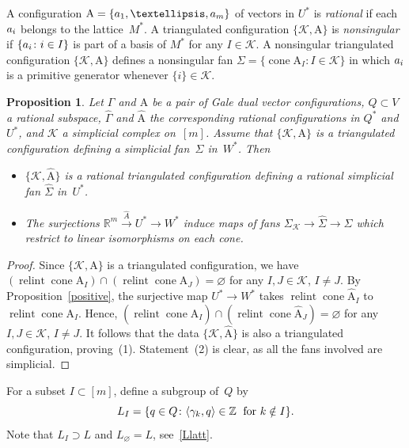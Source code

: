\documentclass[a4paper]{amsart}
\newtheorem{proposition}[theorem]{Proposition}
\theoremstyle{definition}
\theoremstyle{remark}
\numberwithin{equation}{section}
\def\R{\mathbb R}
\def\R{\mathbb R}
\def\Z{\mathbb Z}
\def\sK{\mathcal K}
\newcommand{\mb}[1]{{\textbf {\textit#1}}}
\def\cone{\mathop{\mathrm{cone}}}
\def\relint{\mathop{\mathrm{relint}}}
\newcommand{\<}{\langle}
\renewcommand{\>}{\rangle}
\begin{document}
A configuration $\mathrm A=\{\mb a_1,\ldots,\mb a_m\}$ of vectors in $U^*$ is \emph{rational} if each $\mb a_i$ belongs to the lattice~$M^*$.
A triangulated configuration $\{\mathcal K,\mathrm A\}$ is \emph{nonsingular} if $\{\mb a_i\colon i\in I\}$ is part of a basis of $M^*$ for any $I\in\mathcal K$. A nonsingular triangulated configuration $\{\mathcal K,\mathrm A\}$ defines a nonsingular fan $\Sigma=\{\cone\mathrm A_I\colon I\in\mathcal K\}$ in which $\mb a_i$ is a primitive generator whenever $\{i\}\in\mathcal K$.

\begin{proposition}\label{ahatfan}
Let $\Gamma$ and $\mathrm A$ be a pair of Gale dual vector configurations,  $Q\subset V$ a rational subspace, $\widehat\Gamma$ and $\widehat{\mathrm A}$ the corresponding rational configurations in $Q^*$ and $U^*$, and $\sK$ a simplicial complex on~$[m]$. Assume that $\{\sK,\mathrm A\}$ is a triangulated configuration defining a simplicial fan~$\Sigma$ in~$W^*$. Then 
\begin{itemize}
\item[(1)]
$\{\sK,\widehat{\mathrm A}\}$ is a rational triangulated configuration defining a rational simplicial fan $\widehat\Sigma$ in~$U^*$. 

\item[(2)] The surjections $\R^m\xrightarrow{\widehat A} U^*\to W^*$
induce maps of fans $\Sigma_\sK\to\widehat\Sigma\to\Sigma$ which restrict to linear isomorphisms on each cone.
\end{itemize}
\end{proposition}
\begin{proof}
Since $\{\sK,\mathrm A\}$ is a triangulated configuration, we have $(\relint\cone\mathrm A_I)\cap(\relint\cone\mathrm A_J)=\varnothing$ for any $I,J\in\sK$, $I\ne J$. By Proposition~\ref{positive}, the surjective map $U^*\to W^*$ takes $\relint\cone\widehat{\mathrm A}_I$ to $\relint\cone\mathrm A_I$. Hence, $(\relint\cone\widehat{\mathrm A}_I)\cap(\relint\cone
\widehat{\mathrm A}_J)=\varnothing$ for any $I,J\in\sK$, $I\ne J$. It follows that
the data $\{\sK,\widehat{\mathrm A}\}$ is also a triangulated configuration, proving~(1).  Statement~(2) is clear, as all the fans involved are simplicial.
\end{proof}

For a subset $I\subset[m]$, define a subgroup of~$Q$ by
\[
  L_I
  =\{\mb q\in Q\colon\langle\gamma_k,\mb q\rangle\in\Z\;\text{ for }k\notin I\}.
\]
Note that $L_I\supset L$ and $L_{\varnothing}=L$, see~\eqref{Llatt}.
\end{document}
